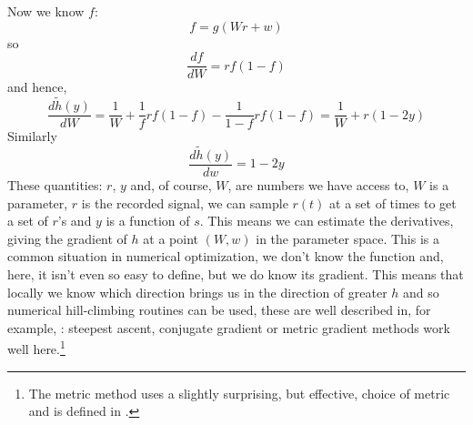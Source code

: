 \documentclass[12pt]{article}
\begin{document}
Now we know $f$:
\begin{equation}
f=g(Wr+w)
\end{equation}
so
\begin{equation}
\frac{df}{dW}=rf(1-f)
\end{equation}
and hence, 
\begin{equation}
\frac{d\tilde{h}(y)}{dW}=\frac{1}{W}+\frac{1}{f}rf(1-f)-\frac{1}{1-f}rf(1-f)=\frac{1}{W}+r(1-2y)
\end{equation}
Similarly
\begin{equation}
\frac{d\tilde{h}(y)}{dw}=1-2y
\end{equation}
These quantities: $r$, $y$ and, of course, $W$, are numbers we have
access to, $W$ is a parameter, $r$ is the recorded signal, we can sample $r(t)$
at a set of times to get a set of $r$'s and $y$ is a function of
$s$. This means we can estimate the derivatives, giving the gradient
of $h$ at a point $(W,w)$ in the parameter space. This is a common
situation in numerical optimization, we don't know the function and,
here, it isn't even so easy to define, but we do know its
gradient. This means that locally we know which direction brings us in
the direction of greater $h$ and so numerical hill-climbing routines
can be used, these are well described in, for example,
\cite{PressEtAl2007}: steepest ascent, conjugate gradient or metric
gradient methods work well here.\footnote{The metric method uses a
  slightly surprising, but effective, choice of metric and is defined in \cite{Amari1998}.}
\end{document}
